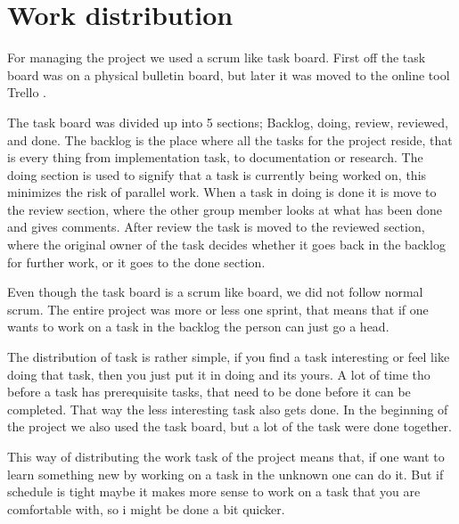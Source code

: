 

\chapter{Work distribution}
For managing the project we used a scrum like task board. First off the task board was on a physical bulletin board, but later it was moved to the online tool Trello \cite{trello}. 

The task board was divided up into 5 sections; Backlog, doing, review, reviewed, and done. The backlog is the place where all the tasks for the project reside, that is every thing from implementation task, to documentation or research. The doing section is used to signify that a task is currently being worked on, this minimizes the risk of parallel work. When a task in doing is done it is move to the review section, where the other group member looks at what has been done and gives comments. After review the task is moved to the reviewed section, where the original owner of the task decides whether it goes back in the backlog for further work, or it goes to the done section.

Even though the task board is a scrum like board, we did not follow normal scrum. The entire project was more or less one sprint, that means that if one wants to work on a task in the backlog the person can just go a head. 

The distribution of task is rather simple, if you find a task interesting or feel like doing that task, then you just put it in doing and its yours. A lot of time tho before a task has prerequisite tasks, that need to be done before it can be completed. That way the less interesting task also gets done. In the beginning of the project we also used the task board, but a lot of the task were done together. 

This way of distributing the work task of the project means that, if one want to learn something new by working on a task in the unknown one can do it. But if schedule is tight maybe it makes more sense to work on a task that you are comfortable with, so i might be done a bit quicker.